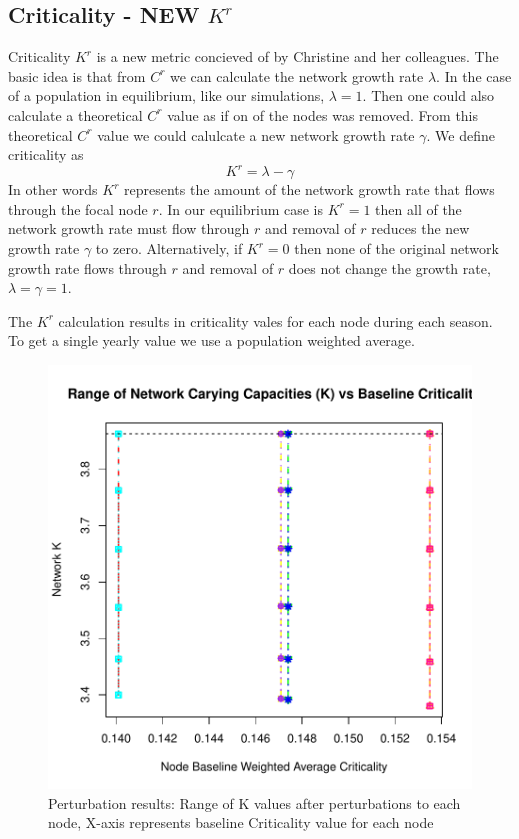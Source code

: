 \documentclass[10pt]{article}
\begin{document}
\newpage
\subsection{Criticality - NEW \texorpdfstring{$K^r$}{KR}}

Criticality $K^r$ is a new metric concieved of by Christine and her colleagues. The basic idea is that from $C^r$ we can calculate the network growth rate $\lambda$. In the case of a population in equilibrium, like our simulations, $\lambda = 1$. Then one could also calculate a theoretical $C^r$ value as if on of the nodes was removed. From this theoretical $C^r$ value we could calulcate a new network growth rate $\gamma$. We define criticality as 
\[K^r = \lambda - \gamma \]
In other words $K^r$ represents the amount of the network growth rate that flows through the focal node $r$. In our equilibrium case is $K^r=1$ then all of the network growth rate must flow through $r$ and removal of $r$ reduces the new growth rate $\gamma$ to zero. Alternatively, if $K^r=0$ then none of the original network growth rate flows through $r$ and removal of $r$ does not change the growth rate, $\lambda=\gamma=1$.

The $K^r$ calculation results in criticality vales for each node during each season. To get a single yearly value we use a population weighted average.



\vspace{-.5cm}
\begin{figure}[H]
\begin{center}
\includegraphics[width=.8\textwidth, height=.8\textwidth]{RGraphics-plant_barcr_KR}
\caption{Perturbation results: Range of K values after perturbations to each node, X-axis represents baseline Criticality value for each node}\label{fig:plant_barcr_KR}
\end{center}
\end{figure}
\end{document}
